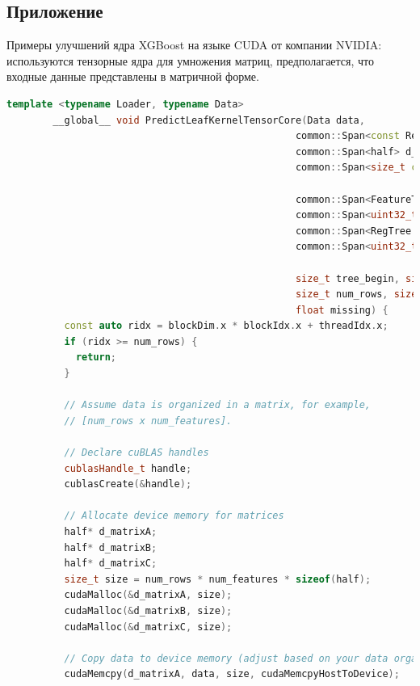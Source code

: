 \documentclass[14pt, a4paper]{extreport}
\begin{document}
    \subsection{Приложение } \label{subsec:xgboost_cuda_tensor_upgrade}
    Примеры улучшений ядра XGBoost на языке CUDA от компании NVIDIA: используются тензорные ядра для умножения матриц, предполагается, что входные данные представлены в матричной форме.

    \begin{lstlisting}[language=C++, label={lst:xgboost_tensor_kernel_calculation}]
        template <typename Loader, typename Data>
        __global__ void PredictLeafKernelTensorCore(Data data,
                                                  common::Span<const RegTree::Node> d_nodes,
                                                  common::Span<half> d_out_predictions,
                                                  common::Span<size_t const> d_tree_segments,

                                                  common::Span<FeatureType const> d_tree_split_types,
                                                  common::Span<uint32_t const> d_cat_tree_segments,
                                                  common::Span<RegTree::CategoricalSplitMatrix::Segment const> d_cat_node_segments,
                                                  common::Span<uint32_t const> d_categories,

                                                  size_t tree_begin, size_t tree_end, size_t num_features,
                                                  size_t num_rows, size_t entry_start, bool use_shared,
                                                  float missing) {
          const auto ridx = blockDim.x * blockIdx.x + threadIdx.x;
          if (ridx >= num_rows) {
            return;
          }

          // Assume data is organized in a matrix, for example,
          // [num_rows x num_features].

          // Declare cuBLAS handles
          cublasHandle_t handle;
          cublasCreate(&handle);

          // Allocate device memory for matrices
          half* d_matrixA;
          half* d_matrixB;
          half* d_matrixC;
          size_t size = num_rows * num_features * sizeof(half);
          cudaMalloc(&d_matrixA, size);
          cudaMalloc(&d_matrixB, size);
          cudaMalloc(&d_matrixC, size);

          // Copy data to device memory (adjust based on your data organization)
          cudaMemcpy(d_matrixA, data, size, cudaMemcpyHostToDevice);


\end{lstlisting}
\end{document}
